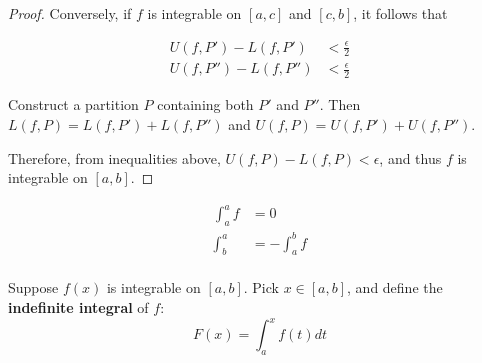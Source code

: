 \documentclass[11pt]{scrartcl}
\begin{document}
\begin{proof}
  Conversely, if $f$ is integrable on $[a, c]$ and $[c, b]$, it follows that

  \begin{align}
    U(f, P') - L(f, P') &< \frac{\epsilon}{2}\\
    U(f, P'') - L(f, P'') &< \frac{\epsilon}{2}
  \end{align}

  Construct a partition $P$ containing both $P'$ and $P''$.  Then
  $L(f, P) = L(f, P') + L(f, P'')$ and
  $U(f, P) = U(f, P') + U(f, P'')$.

  Therefore, from inequalities above, $U(f, P) - L(f, P) < \epsilon$,
  and thus $f$ is integrable on $[a,b]$.

\end{proof}

\begin{definition}
  \begin{align}
    \int_a^af  &= 0\\
    \int_b^{a} &= - \int_{a}^bf\\
  \end{align}
\end{definition}

\begin{definition}
  Suppose $f(x)$ is integrable on $[a, b]$. Pick $x\in[a,b]$, and
  define the \textbf{indefinite integral} of $f$:
  \begin{equation*}
    F(x) = \int_{a}^{x}f(t)dt
  \end{equation*}
\end{definition}
\end{document}
